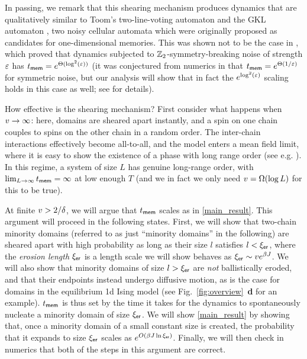 \documentclass[prl,aps,twocolumn,groupedaddress,superscriptaddress,preprintnumbers,nobibnotes]{revtex4-2}
\newcommand{\tmem}{{t_{\sf mem}}}
\newcommand{\ler}{{\xi_{\sf er}}} %
\begin{document}
	In passing, we remark that this shearing mechanism produces dynamics that are qualitatively similar to Toom's two-line-voting automaton \cite{toom1995cellular,park1997ergodicity} and the GKL automaton \cite{gacs1978one}, two noisy cellular automata which were originally proposed as candidates for one-dimensional memories. This was shown not to be the case in \cite{park1997ergodicity}, which proved that dynamics subjected to $\mathbb{Z}_2 $-symmetry-breaking noise of strength $\varepsilon$ has $\tmem = e^{\ct(\log^2(\ep))}$ (it was conjectured from numerics in \cite{de1992gacs} that $\tmem = e^{\ct(1/\ep)}$ for symmetric noise, but our analysis will show that in fact the $e^{\log^2(\varepsilon)}$ scaling holds in this case as well; see \cite{code} for details).
	
	How effective is the shearing mechanism? First consider what happens when $v \rightarrow \infty$: here, domains are sheared apart instantly, and a spin on one chain couples to spins on the other chain in a random order. The inter-chain interactions effectively become all-to-all, and the model enters a mean field limit, where it is easy to show the existence of a phase with long range order (see e.g. \cite{kadau2008magnetic,hucht2009nonequilibrium}). In this regime, a system of size $L$ has genuine long-range order, with $\lim_{L \ra\infty}\tmem = \infty$ at low enough $T$ (and we in fact we only need $v = \Omega(\log L)$ for this to be true). 
	
	At finite $v>2/\delta$, we will argue that $\tmem$ scales as in \eqref{main_result}. This argument will proceed in the following states. First, we will show that two-chain minority domains (referred to as just ``minority domains'' in the following) are sheared apart with high probability as long as their size $l$ satisfies $l < \ler$, where the {\it erosion length} $\ler$ is a length scale we will show behaves as $\ler \sim v e^{\b J}$. We will also show that minority domains of size $l > \ler$ are {\it not} ballistically eroded, and that their endpoints instead undergo diffusive motion, as is the case for domains in the equilibrium 1d Ising model (see Fig.~\ref{fig:overview}~{\bf d} for an example). $\tmem$ is thus set by the time it takes for the dynamics to spontaneously nucleate a minority domain of size $\ler$. We will show \eqref{main_result} by showing that, once a minority domain of a small constant size is created, the probability that it expands to size $\ler$ scales as $e^{O(\b J \ln \ler )}$. Finally, we will then check in numerics that both of the steps in this argument are correct. 
\end{document}
